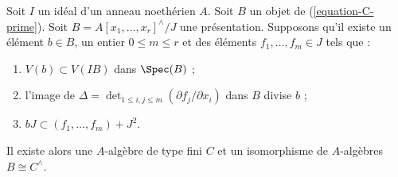 \begin{lemma}
\label{lemma-approximate-presentation-rig-smooth}
Soit $I$ un idéal d'un anneau noethérien $A$. Soit $B$ un objet de
(\ref{equation-C-prime}). Soit
$B = A[x_1, \ldots, x_r]^\wedge/J$ une présentation. Supposons qu'il existe
un élément $b \in B$, un entier $0 \leq m \leq r$ et des éléments
$f_1, \ldots, f_m \in J$ tels que :
\begin{enumerate}
\item $V(b) \subset V(IB)$ dans $\Spec(B)$ ;
\item l'image de
$\Delta = \det_{1 \leq i, j \leq m}(\partial f_j/\partial x_i)$
dans $B$ divise $b$ ;
\item $b J \subset (f_1, \ldots, f_m) + J^2$.
\end{enumerate}
Il existe alors une $A$-algèbre de type fini $C$ et un isomorphisme de
$A$-algèbres $B \cong C^\wedge$.
\end{lemma}


